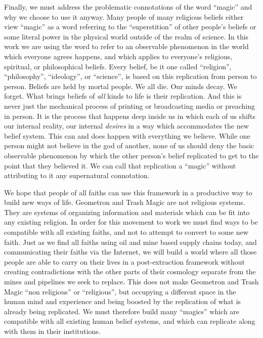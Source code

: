 Finally, we must address the problematic connotations of the word
``magic'' and why we choose to use it anyway. Many people of many
religious beliefs either view ``magic'' as a word referring to the
``superstition'' of other people's beliefs or some literal power in the
physical world outside of the realm of science. In this work we are
using the word to refer to an observable phenomenon in the world which
everyone agrees happens, and which applies to everyone's religious,
spiritual, or philosophical beliefs. Every belief, be it one called
``religion'', ``philosophy'', ``ideology'', or ``science'', is based on
this replication from person to person. Beliefs are held by mortal
people. We all die. Our minds decay. We forget. What brings beliefs of
\emph{all} kinds to life is their replication. And this is never just
the mechanical process of printing or broadcasting media or preaching in
person. It is the process that happens deep inside us in which each of
us shifts our internal reality, our internal \emph{desires} in a way
which accommodates the new belief system. This can and does happen with
everything we believe. While one person might not believe in the god of
another, none of us should deny the basic observable phenomenon by which
the other person's belief replicated to get to the point that they
believed it. We can call that replication a ``magic'' without
attributing to it any supernatural connotation.

We hope that people of all faiths can use this framework in a productive
way to build new ways of life. Geometron and Trash Magic are not
religious systems. They are systems of organizing information and
materials which can be fit into any existing religion. In order for this
movement to work we must find ways to be compatible with all existing
faiths, and not to attempt to convert to some new faith. Just as we find
all faiths using oil and mine based supply chains today, and
communicating their faiths via the Internet, we will build a world where
all those people are able to carry on their lives in a post-extraction
framework without creating contradictions with the other parts of their
cosmology separate from the mines and pipelines we seek to replace. This
does not make Geometron and Trash Magic ``non religious'' or
``religious'', but occupying a different space in the human mind and
experience and being boosted by the replication of what is already being
replicated. We must therefore build many ``magics'' which are compatible
with all existing human belief systems, and which can replicate along
with them in their institutions.
